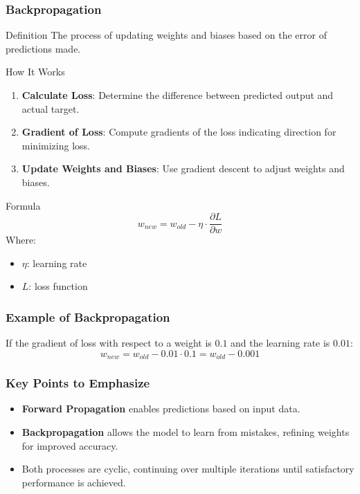 \documentclass[aspectratio=169]{beamer}
\begin{document}
\begin{frame}[fragile]
    \frametitle{Backpropagation}
    \begin{block}{Definition}
        The process of updating weights and biases based on the error of predictions made.
    \end{block}
    
    \begin{block}{How It Works}
        \begin{enumerate}
            \item \textbf{Calculate Loss}: Determine the difference between predicted output and actual target.
            \item \textbf{Gradient of Loss}: Compute gradients of the loss indicating direction for minimizing loss.
            \item \textbf{Update Weights and Biases}: Use gradient descent to adjust weights and biases.
        \end{enumerate}
    \end{block}

    \begin{block}{Formula}
        \begin{equation}
            w_{new} = w_{old} - \eta \cdot \frac{\partial L}{\partial w}
        \end{equation}
        Where:
        \begin{itemize}
            \item \( \eta \): learning rate
            \item \( L \): loss function
        \end{itemize}
    \end{block}
\end{frame}

\begin{frame}[fragile]
    \frametitle{Example of Backpropagation}
    If the gradient of loss with respect to a weight is \( 0.1 \) and the learning rate is \( 0.01 \):
    \[
    w_{new} = w_{old} - 0.01 \cdot 0.1 = w_{old} - 0.001
    \]
\end{frame}

\begin{frame}[fragile]
    \frametitle{Key Points to Emphasize}
    \begin{itemize}
        \item \textbf{Forward Propagation} enables predictions based on input data.
        \item \textbf{Backpropagation} allows the model to learn from mistakes, refining weights for improved accuracy.
        \item Both processes are cyclic, continuing over multiple iterations until satisfactory performance is achieved.
    \end{itemize}
\end{frame}
\end{document}

